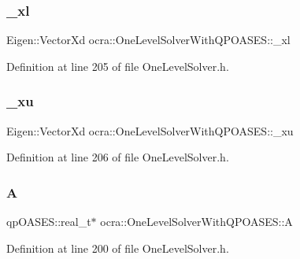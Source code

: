 \subsubsection{\texorpdfstring{\+\_\+xl}{\_xl}}
{\footnotesize\ttfamily Eigen\+::\+Vector\+Xd ocra\+::\+One\+Level\+Solver\+With\+Q\+P\+O\+A\+S\+E\+S\+::\+\_\+xl\hspace{0.3cm}{\ttfamily [protected]}}



Definition at line 205 of file One\+Level\+Solver.\+h.

\hypertarget{classocra_1_1OneLevelSolverWithQPOASES_a23dd435ea8582fc67bf77373e0afc3e0}{}\label{classocra_1_1OneLevelSolverWithQPOASES_a23dd435ea8582fc67bf77373e0afc3e0} 
\subsubsection{\texorpdfstring{\+\_\+xu}{\_xu}}
{\footnotesize\ttfamily Eigen\+::\+Vector\+Xd ocra\+::\+One\+Level\+Solver\+With\+Q\+P\+O\+A\+S\+E\+S\+::\+\_\+xu\hspace{0.3cm}{\ttfamily [protected]}}



Definition at line 206 of file One\+Level\+Solver.\+h.

\hypertarget{classocra_1_1OneLevelSolverWithQPOASES_a8263c27c6bda731ab9dc9550a668e491}{}\label{classocra_1_1OneLevelSolverWithQPOASES_a8263c27c6bda731ab9dc9550a668e491} 
\subsubsection{\texorpdfstring{A}{A}}
{\footnotesize\ttfamily qp\+O\+A\+S\+E\+S\+::real\+\_\+t$\ast$ ocra\+::\+One\+Level\+Solver\+With\+Q\+P\+O\+A\+S\+E\+S\+::A\hspace{0.3cm}{\ttfamily [protected]}}



Definition at line 200 of file One\+Level\+Solver.\+h.

